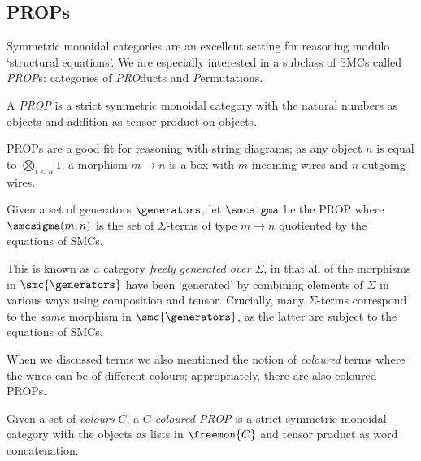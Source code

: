 \subsection{PROPs}

Symmetric monoidal categories are an excellent setting for reasoning modulo
`structural equations'.
We are especially interested in a subclass of SMCs called \emph{PROP}s:
categories of \emph{PRO}ducts and \emph{P}ermutations.

\begin{definition}\label{def:prop}
    A \emph{PROP} is a strict symmetric monoidal category with the
    natural numbers as objects and addition as tensor product on objects.
\end{definition}

PROPs are a good fit for reasoning with string diagrams; as any
object \(n\) is equal to \(\bigotimes_{i < n} 1\), a morphism
\(m \to n\) is a box with \(m\) incoming wires and \(n\) outgoing wires.

\begin{definition}\label{def:freely-generated-prop}
    Given a set of generators \(\generators\), let \(\smcsigma\) be the
    PROP where \(\smcsigma(m, n)\) is the set of \(\Sigma\)-terms of type
    \(m \to n\) quotiented by the equations of SMCs.
\end{definition}

This is known as a category \emph{freely generated over} \(\Sigma\), in that all
of the morphisms in \(\smc{\generators}\) have been `generated' by combining
elements of \(\Sigma\) in various ways using composition and tensor.
Crucially, many \(\Sigma\)-terms correspond to the \emph{same} morphism in
\(\smc{\generators}\), as the latter are subject to the equations of SMCs.

When we discussed terms we also mentioned the notion of \emph{coloured} terms
where the wires can be of different colours; appropriately, there are also
coloured PROPs.

\begin{definition}
    Given a set of \emph{colours} \(C\), a \emph{\(C\)-coloured PROP} is a strict
    symmetric monoidal category with the objects as lists in \(\freemon{C}\) and
    tensor product as word concatenation.
\end{definition}

